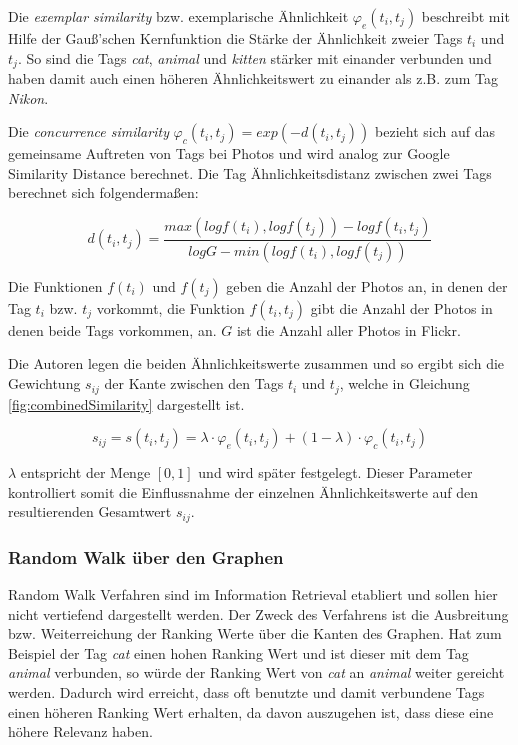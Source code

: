Die \emph{exemplar similarity} bzw. exemplarische Ähnlichkeit $\varphi_e(t_i, t_j)$ beschreibt mit Hilfe der Gauß'schen Kernfunktion die Stärke der Ähnlichkeit zweier Tags $t_i$ und $t_j$. So sind die Tags \emph{cat}, \emph{animal} und \emph{kitten} stärker mit einander verbunden und haben damit auch einen höheren Ähnlichkeitswert zu einander als z.B. zum Tag \emph{Nikon}.

Die \emph{concurrence similarity} $\varphi_c(t_i, t_j) = exp(-d(t_i, t_j))$ bezieht sich auf das gemeinsame Auftreten von Tags bei Photos und wird analog zur Google Similarity Distance \cite{googleDistance} berechnet. Die Tag Ähnlichkeitsdistanz zwischen zwei Tags berechnet sich folgendermaßen:

\begin{figure}[hptb]
  \begin{equation}
  \label{fig:concurrenceDistance}
    d(t_i, t_j) = \frac{max(log f(t_i), log f(t_j)) - log f(t_i, t_j)}{log G - min(log f(t_i), log f(t_j))}
  \end{equation}
\end{figure}

Die Funktionen $f(t_i)$ und $f(t_j)$ geben die Anzahl der Photos an, in denen der Tag $t_i$ bzw. $t_j$ vorkommt, die Funktion $f(t_i, t_j)$ gibt die Anzahl der Photos in denen beide Tags vorkommen, an. $G$ ist die Anzahl aller Photos in Flickr.

Die Autoren legen die beiden Ähnlichkeitswerte zusammen und so ergibt sich die Gewichtung $s_{ij}$ der Kante zwischen den Tags $t_i$ und $t_j$, welche in Gleichung \ref{fig:combinedSimilarity} dargestellt ist.
\begin{figure}[!hptb]
  \begin{equation}
  \label{fig:combinedSimilarity}
    s_{ij} = s(t_i, t_j) = \lambda \cdot \varphi_e(t_i, t_j) + (1 - \lambda) \cdot \varphi_c(t_i, t_j)
  \end{equation}
\end{figure}

$\lambda$ entspricht der Menge $[0,1]$ und wird später festgelegt. Dieser Parameter kontrolliert somit die Einflussnahme der einzelnen Ähnlichkeitswerte auf den resultierenden Gesamtwert $s_{ij}$.




\subsubsection{Random Walk über den Graphen} %
\label{ssub:random_walk_ueber_den_graphen}
Random Walk Verfahren sind im Information Retrieval etabliert und sollen hier nicht vertiefend dargestellt werden. Der Zweck des Verfahrens ist die Ausbreitung bzw. Weiterreichung der Ranking Werte über die Kanten des Graphen. Hat zum Beispiel der Tag \emph{cat} einen hohen Ranking Wert und ist dieser mit dem Tag \emph{animal} verbunden, so würde der Ranking Wert von \emph{cat} an \emph{animal} weiter gereicht werden. Dadurch wird erreicht, dass oft benutzte und damit verbundene Tags einen höheren Ranking Wert erhalten, da davon auszugehen ist, dass diese eine höhere Relevanz haben.

